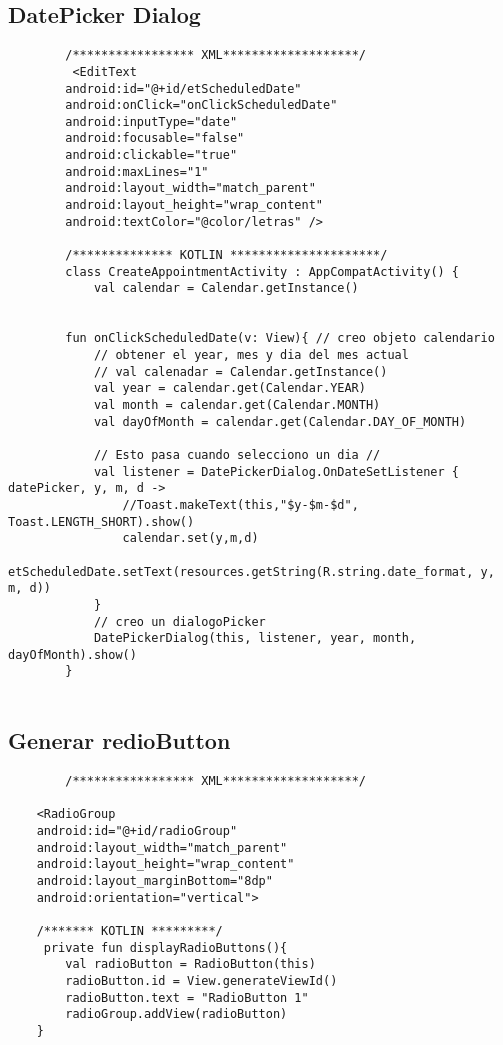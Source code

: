 \documentclass[a4paper]{article}
\begin{document}
	\subsection{DatePicker Dialog}
	
	\begin{lstlisting}
		/***************** XML*******************/
		 <EditText
		android:id="@+id/etScheduledDate"
		android:onClick="onClickScheduledDate"
		android:inputType="date"
		android:focusable="false"
		android:clickable="true"
		android:maxLines="1"
		android:layout_width="match_parent"
		android:layout_height="wrap_content"
		android:textColor="@color/letras" />
		
		/************** KOTLIN *********************/
		class CreateAppointmentActivity : AppCompatActivity() {
			val calendar = Calendar.getInstance()
			
		
		fun onClickScheduledDate(v: View){ // creo objeto calendario
			// obtener el year, mes y dia del mes actual
			// val calenadar = Calendar.getInstance()
			val year = calendar.get(Calendar.YEAR)
			val month = calendar.get(Calendar.MONTH)
			val dayOfMonth = calendar.get(Calendar.DAY_OF_MONTH)
			
			// Esto pasa cuando selecciono un dia //
			val listener = DatePickerDialog.OnDateSetListener { datePicker, y, m, d ->
				//Toast.makeText(this,"$y-$m-$d", Toast.LENGTH_SHORT).show()
				calendar.set(y,m,d)
				etScheduledDate.setText(resources.getString(R.string.date_format, y, m, d))
			}
			// creo un dialogoPicker
			DatePickerDialog(this, listener, year, month, dayOfMonth).show()
		}
		
	\end{lstlisting}


	\subsection{Generar redioButton}
	
	\begin{lstlisting}
		/***************** XML*******************/
	
	<RadioGroup
	android:id="@+id/radioGroup"
	android:layout_width="match_parent"
	android:layout_height="wrap_content"
	android:layout_marginBottom="8dp"
	android:orientation="vertical">
	
	/******* KOTLIN *********/
	 private fun displayRadioButtons(){
		val radioButton = RadioButton(this)
		radioButton.id = View.generateViewId()
		radioButton.text = "RadioButton 1"
		radioGroup.addView(radioButton)
	}
	
\end{lstlisting}
\end{document}
